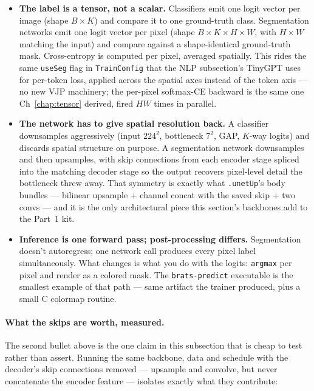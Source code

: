 \begin{itemize}
  \item \textbf{The label is a tensor, not a scalar.} Classifiers emit
    one logit vector per image (shape $B \times K$) and compare it to
    one ground-truth class. Segmentation networks emit one logit
    vector per pixel (shape $B \times K \times H \times W$, with
    $H \times W$ matching the input) and compare against a
    shape-identical ground-truth mask. Cross-entropy is computed per
    pixel, averaged spatially. This rides the same \texttt{useSeg} flag
    in \texttt{TrainConfig} that the NLP subsection's TinyGPT uses for
    per-token loss, applied across the spatial axes instead of the
    token axis --- no new VJP machinery; the per-pixel softmax-CE
    backward is the same one Ch~\ref{chap:tensor} derived, fired $HW$
    times in parallel.
  \item \textbf{The network has to give spatial resolution back.}
    A classifier downsamples aggressively (input $224^2$, bottleneck
    $7^2$, GAP, $K$-way logits) and discards spatial structure on
    purpose. A segmentation network downsamples and then
    upsamples, with skip connections from each encoder stage
    spliced into the matching decoder stage so the output recovers
    pixel-level detail the bottleneck threw away. That symmetry is
    exactly what \texttt{.unetUp}'s body bundles --- bilinear upsample
    + channel concat with the saved skip + two convs --- and it is the
    only architectural piece this section's backbones add to the Part~1
    kit.
  \item \textbf{Inference is one forward pass; post-processing
    differs.} Segmentation doesn't autoregress; one network call
    produces every pixel label simultaneously. What changes is what
    you do with the logits: \texttt{argmax} per pixel and render as a
    colored mask. The \texttt{brats-predict} executable is the smallest
    example of that path --- same artifact the trainer produced, plus a
    small C colormap routine.
\end{itemize}

\paragraph{What the skips are worth, measured.} The second bullet above is the
one claim in this subsection that is cheap to test rather than assert. Running
the same backbone, data and schedule with the decoder's skip connections
removed --- upsample and convolve, but never concatenate the encoder feature ---
isolates exactly what they contribute:

